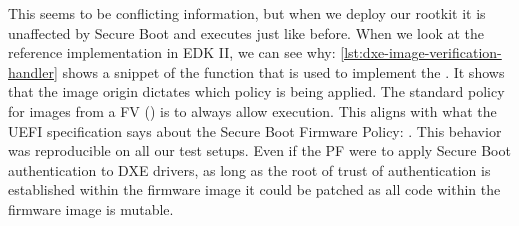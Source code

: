 This seems to be conflicting information, but when we deploy our rootkit it is unaffected by Secure Boot and executes just like before.
When we look at the reference implementation in \ac{EDK} II, we can see why: \autoref{lst:dxe-image-verification-handler} shows a snippet of the function that is used to implement the .
It shows that the image origin dictates which policy is being applied.
The standard policy for images from a \acf{FV} () is to always allow execution.
This aligns with what the \ac{UEFI} specification says about the Secure Boot Firmware Policy:
.
This behavior was reproducible on all our test setups.
Even if the \ac{PF} were to apply Secure Boot authentication to \ac{DXE} drivers, as long as the root of trust of authentication is established within the firmware image it could be patched as all code within the firmware image is mutable.

\vspace{1em}



\clearpage